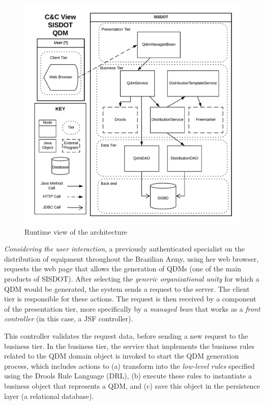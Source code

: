 \begin{figure}[!ht] %
	\includegraphics[scale=0.49]{img/runtimeView_qdm.png}
	\caption{Runtime view of the architecture} 
	\label{fig:runtime_qdm}
\end{figure}



\emph{Considering the user interaction}, a previously authenticated specialist on the distribution of equipment throughout the Brazilian Army, using her web browser, requests the web page that allows the generation of QDMs (one of the main products of SISDOT). 
After selecting the \emph{generic organizational unity} for which a QDM would be generated, the system sends a request to the server. The client tier is responsible for these actions. The request is then received by a component of the presentation tier, more specifically by a \emph{managed bean} that works as a \emph{front controller} (in this case, a JSF controller). 

This controller validates the request data, before sending a new request to the business tier. In the business tier, the service 
that implements the business rules related to the QDM domain object is invoked to start the QDM generation process, which includes actions to (a) transform \callers into the \emph{low-level rules} specified using the Drools Rule Language (DRL), (b) execute these rules to instantiate a business object that represents a QDM, and (c) save this object in the persistence layer (a relational database). 

